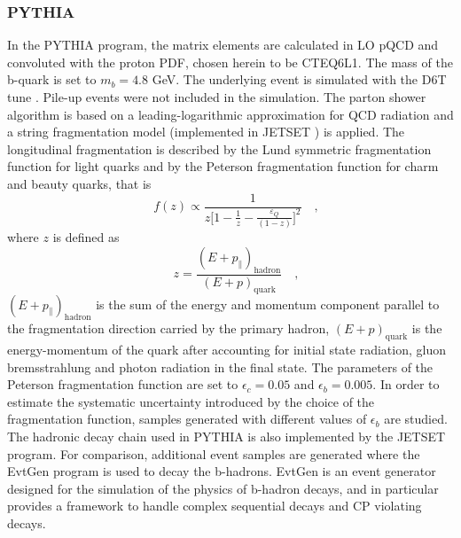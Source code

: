 \subsubsection{PYTHIA}
In the PYTHIA program, the matrix elements are calculated in LO pQCD and
convoluted with the proton PDF, chosen herein to be CTEQ6L1. The mass of
the b-quark is set to $m_b=4.8$ GeV. The underlying event is simulated with the
D6T tune%
. Pile-up events were not included in the simulation. The parton
shower algorithm is based on a leading-logarithmic approximation for QCD radiation 
and a string fragmentation model (implemented in JETSET%
) is applied.
The longitudinal fragmentation is described by the Lund symmetric fragmentation 
function %
for light quarks and by the Peterson fragmentation function for
charm and beauty quarks, that is
\begin{displaymath}\quad
f(z)\propto\frac{1}{z\Big[1-\frac{1}{z}-\frac{\varepsilon_Q}{(1-z)}\Big]^2} \quad,
\end{displaymath}
where $z$ is defined as
\begin{displaymath}\quad
z=\frac{(E+p_\parallel)_\mathrm{hadron}}{(E+p)_\mathrm{quark}} \quad,
\end{displaymath}
$(E+p_\parallel)_\mathrm{hadron}$ is the sum of the energy and momentum component parallel to the fragmentation direction carried by the primary hadron, $(E+p)_\mathrm{quark}$ is the energy-momentum of the quark after accounting for initial state radiation, gluon bremsstrahlung and photon radiation in the final state. The parameters of the Peterson fragmentation function
are set to $\epsilon_c=0.05$ and $\epsilon_b=0.005$. In order to estimate the systematic uncertainty 
introduced by the choice of the fragmentation function, samples generated
with different values of $\epsilon_b$ are studied. The hadronic decay chain used in PYTHIA
is also implemented by the JETSET program. For comparison, additional event
samples are generated where the EvtGen program is used to decay the b-hadrons. 
EvtGen is an event generator designed for the simulation of the physics
of b-hadron decays, and in particular provides a framework to handle complex
sequential decays and CP violating decays.

